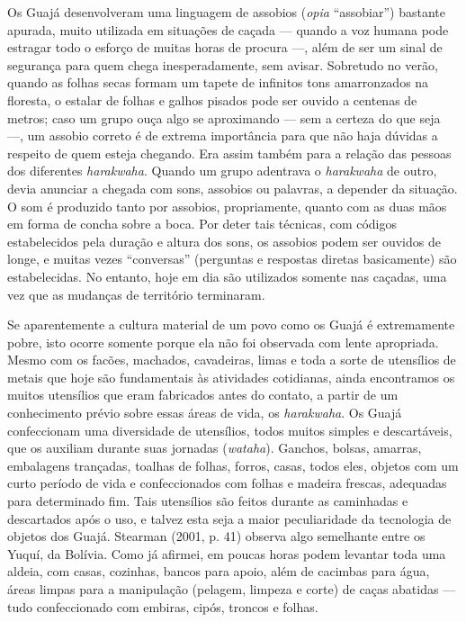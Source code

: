 Os Guajá desenvolveram uma linguagem de assobios (\emph{opia}
``assobiar'') bastante apurada, muito utilizada em situações de caçada ---
quando a voz humana pode estragar todo o esforço de muitas horas de
procura ---, além de ser um sinal de segurança para quem chega
inesperadamente, sem avisar. Sobretudo no verão, quando as folhas secas
formam um tapete de infinitos tons amarronzados na floresta, o estalar
de folhas e galhos pisados pode ser ouvido a centenas de metros; caso um
grupo ouça algo se aproximando --- sem a certeza do que seja ---, um assobio
correto é de extrema importância para que não haja dúvidas a respeito de
quem esteja chegando. Era assim também para a relação das pessoas dos
diferentes \emph{harakwaha}. Quando um grupo adentrava o
\emph{harakwaha} de outro, devia anunciar a chegada com sons, assobios
ou palavras, a depender da situação. O som é produzido tanto por
assobios, propriamente, quanto com as duas mãos em forma de concha sobre
a boca. Por deter tais técnicas, com códigos estabelecidos pela duração
e altura dos sons, os assobios podem ser ouvidos de longe, e muitas
vezes ``conversas'' (perguntas e respostas diretas basicamente) são
estabelecidas. No entanto, hoje em dia são utilizados somente nas
caçadas, uma vez que as mudanças de território terminaram.

Se aparentemente a cultura material de um povo como os Guajá é
extremamente pobre, isto ocorre somente porque ela não foi observada com
lente apropriada. Mesmo com os facões, machados, cavadeiras, limas e
toda a sorte de utensílios de metais que hoje são fundamentais às
atividades cotidianas, ainda encontramos os muitos utensílios que eram
fabricados antes do contato, a partir de um conhecimento prévio sobre
essas áreas de vida, os \emph{harakwaha}. Os Guajá confeccionam uma
diversidade de utensílios, todos muitos simples e descartáveis, que os
auxiliam durante suas jornadas (\emph{wataha}). Ganchos, bolsas,
amarras, embalagens trançadas, toalhas de folhas, forros, casas, todos
eles, objetos com um curto período de vida e confeccionados com folhas e
madeira frescas, adequadas para determinado fim. Tais utensílios são
feitos durante as caminhadas e descartados após o uso, e talvez esta
seja a maior peculiaridade da tecnologia de objetos dos Guajá. Stearman
(2001, p. 41) observa algo semelhante entre os Yuquí, da Bolívia. Como já
afirmei, em poucas horas podem levantar toda uma aldeia, com casas,
cozinhas, bancos para apoio, além de cacimbas para água, áreas limpas
para a manipulação (pelagem, limpeza e corte) de caças abatidas --- tudo
confeccionado com embiras, cipós, troncos e folhas.

